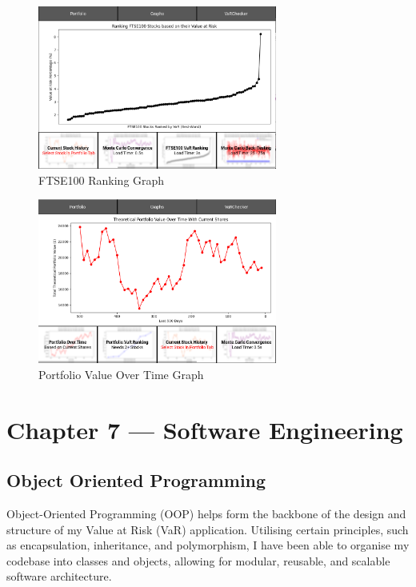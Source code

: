 \documentclass{article}
\begin{document}
\begin{figure}[h]
  \centering
  \includegraphics[width=0.7\textwidth]{Images/Term 2 Images/Screenshot 2024-04-12 062656.png}
  \caption{FTSE100 Ranking Graph}
  \label{fig:FTSE100 Ranking Graph}
\end{figure}

\begin{figure}[h]
  \centering
  \includegraphics[width=0.7\textwidth]{Images/Term 2 Images/Screenshot 2024-04-12 062324.png}
  \caption{Portfolio Value Over Time Graph}
  \label{fig:Portfolio Value Over Time Graph}
\end{figure}


\section{Chapter 7 --- Software Engineering}

\subsection{Object Oriented Programming}

Object-Oriented Programming (OOP) helps form the backbone of the design and structure of my Value at Risk (VaR) application. Utilising certain principles, such as encapsulation, inheritance, and polymorphism, I have been able to organise my codebase into classes and objects, allowing for modular, reusable, and scalable software architecture.\\\vspace{0.3cm}
\end{document}
